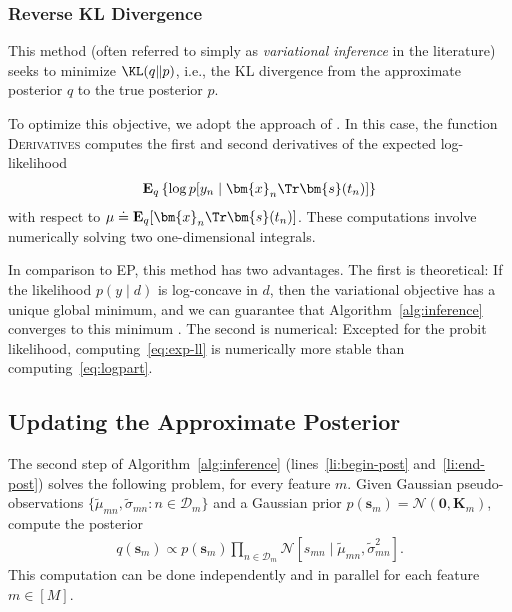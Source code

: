 \subsubsection{Reverse KL Divergence}

This method (often referred to simply as \emph{variational inference} in the literature) seeks to minimize $\KL(q \Vert p)$, i.e., the KL divergence from the approximate posterior $q$ to the true posterior $p$.

To optimize this objective, we adopt the approach of \citet{khan2017conjugate}.
In this case, the function \textsc{Derivatives} computes the first and second derivatives of the expected log-likelihood
\begin{align}
\label{eq:exp-ll}
\mathbf{E}_q \left\{ \log p[y_n \mid \bm{x}_n\Tr \bm{s}(t_n)] \right\}
\end{align}
with respect to $\mu \doteq \mathbf{E}_q[\bm{x}_n\Tr \bm{s}(t_n)]$.
These computations involve numerically solving two one-dimensional integrals.

In comparison to EP, this method has two advantages.
The first is theoretical:
If the likelihood $p(y \mid d)$ is log-concave in $d$, then the variational objective has a unique global minimum, and we can guarantee that Algorithm~\ref{alg:inference} converges to this minimum \citep{khan2017conjugate}.
The second is numerical:
Excepted for the probit likelihood, computing~\eqref{eq:exp-ll} is numerically more stable than computing~\eqref{eq:logpart}.


\subsection{Updating the Approximate Posterior}
\label{sec:inf-posterior}

The second step of Algorithm~\ref{alg:inference} (lines~\ref{li:begin-post} and~\ref{li:end-post}) solves the following problem, for every feature $m$.
Given Gaussian pseudo-observations $\{ \tilde{\mu}_{mn}, \tilde{\sigma}_{mn} : n \in \mathcal{D}_m \}$ and a Gaussian prior $p(\bm{s}_m) = \mathcal{N}(\bm{0}, \bm{K}_m)$, compute the posterior
\begin{align*}
q(\bm{s}_m) \propto p(\bm{s}_m) \prod_{n \in \mathcal{D}_m} \mathcal{N}[s_{mn} \mid \tilde{\mu}_{mn}, \tilde{\sigma}^2_{mn}].
\end{align*}
This computation can be done independently and in parallel for each feature $m \in [M]$.

